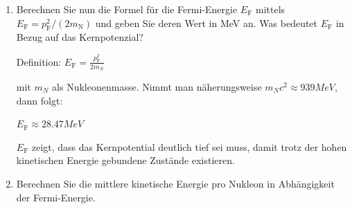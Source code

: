 \documentclass[11pt,a4paper]{scrartcl}
\begin{document}
\begin{enumerate}
                \begin{calculationbox}
                    Setzen näherungswwweise für jede Nukleonenart: $n = \frac{A}{2}$

                    Außerdem ist der Kernradius: $R = R_0 A^\frac{1}{3}$, mit $R_0 = 1.3$ fm.

                    Daraus folgt für das Kernvolumen: $V = \frac{4}{3} \pi R^3 = \frac{4}{3} \pi R_0^3 A$

                    Jetzt setze man: $n = \frac{V p_\text{F}^3}{3 \pi^2 \hbar^3}$ ein

                    Also : $\frac{A}{2} \frac{\frac{4}{3} \pi R_0^3 A p_\text{F}^3}{3 \pi^2 \hbar^3}$

                    $p_\text{F}^3 = \frac{\frac{9\pi}{8} \hbar^3}{R_0^3}$

                    also $p_\text{F} = \frac{\hbar}{R_0} (9 \frac{\pi}{8})^\frac{1}{3}$

                    Mit $\hbar = 197.3269804$ MeV fm und $R_0 = 1.3$ fm

                    $p_\text{F} c = \frac{\hbar c}{R_0} (9 \frac{\pi}{8})^\frac{1}{3} \approx 231.21$ MeV

                    $p_\text{F} \approx 231$ MeV$/$c
                \end{calculationbox}

            \item
                Berechnen Sie nun die Formel für die Fermi-Energie $E_\text{F}$ mittels $E_\text{F} = p^2_\text{F} / (2 m_\text{N})$ und geben Sie deren Wert in MeV an. Was bedeutet $E_\text{F}$ in Bezug auf das Kernpotenzial?

                \begin{calculationbox}
                    Definition: $E_\text{F} = \frac{p_\text{F}^2}{2 m_N}$
                    
                    mit $m_N$ als Nukleonenmasse. Nimmt man näherungsweise $m_N c^2 \approx 939 MeV$, dann folgt:

                    $E_\text{F} \approx 28.47 MeV$

                    $E_\text{F}$ zeigt, dass das Kernpotential deutlich tief sei muss, damit trotz der hohen kinetischen Energie gebundene Zustände existieren.
                \end{calculationbox}

            \item 
                Berechnen Sie die mittlere kinetische Energie pro Nukleon in Abhängigkeit der Fermi-Energie.


\end{enumerate}
\end{document}
